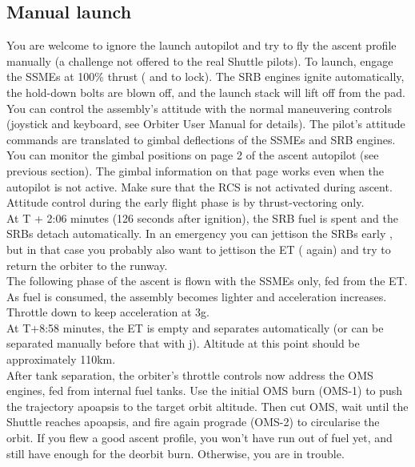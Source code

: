 \subsection{Manual launch}
You are welcome to ignore the launch autopilot and try to fly the ascent profile manually (a challenge not offered to the real Shuttle pilots). To launch, engage the SSMEs at 100\% thrust ( and  to lock). The SRB engines ignite automatically, the hold-down bolts are blown off, and the launch stack will lift off from the pad. You can control the assembly’s attitude with the normal maneuvering controls (joystick and keyboard, see Orbiter User Manual for details). The pilot’s attitude commands are translated to gimbal deflections of the SSMEs and SRB engines. You can monitor the gimbal positions on page 2 of the ascent autopilot (see previous section). The gimbal information on that page works even when the autopilot is not active. Make sure that the RCS is not activated during ascent. Attitude control during the early flight phase is by thrust-vectoring only.\\

At T + 2:06 minutes (126 seconds after ignition), the SRB fuel is spent and the SRBs detach automatically. In an emergency you can jettison the SRBs early , but in that case you probably also want to jettison the ET ( again) and try to return the orbiter to the runway.\\

The following phase of the ascent is flown with the SSMEs only, fed from the ET. As fuel is consumed, the assembly becomes lighter and acceleration increases. Throttle down to keep acceleration at 3g.\\

At T+8:58 minutes, the ET is empty and separates automatically (or can be separated manually before that with j). Altitude at this point should be approximately 110km.\\

After tank separation, the orbiter’s throttle controls now address the OMS engines, fed from internal fuel tanks. Use the initial OMS burn (OMS-1) to push the trajectory apoapsis to the target orbit altitude. Then cut OMS, wait until the Shuttle reaches apoapsis, and fire again prograde (OMS-2) to circularise the orbit. If you flew a good ascent profile, you won’t have run out of fuel yet, and still have enough for the deorbit burn. Otherwise, you are in trouble.\\

